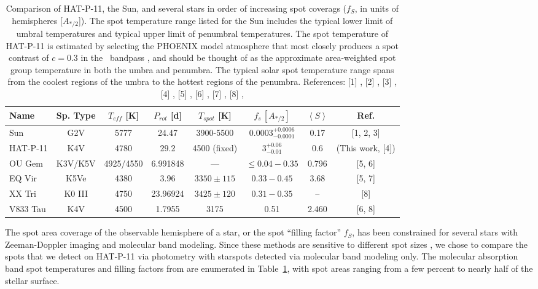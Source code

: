 \begin{table}
\centering
\footnotesize
\begin{tabular}{|lccccccc|} 
\hline
Name & Sp. Type & $T_{eff}$ [K] & $P_{rot}$ [d] & $T_{spot}$ [K] & $f_s \, [A_{*/2}]$ & $\left < S \right>$ & Ref. \\ \hline \hline
Sun & G2V & 5777 & 24.47 & 3900-5500 & $0.0003^{+0.0006}_{-0.0001}$ & 0.17 & [1, 2, 3]\\
HAT-P-11 & K4V & 4780 & 29.2 & 4500 (fixed) & $3^{+0.06}_{-0.01}$ & 0.6 & (This work, [4]) \\
OU Gem  & K3V/K5V & 4925/4550 & 6.991848 & --- & $\le 0.04 - 0.35$ & 0.796 & [5, 6] \\
EQ Vir  & K5Ve & 4380 & 3.96 &  $3350 \pm 115$ &$0.33 - 0.45$ & 3.68 & [5, 7] \\
XX Tri & K0 III & 4750 & 23.96924 & $3425 \pm 120$ & $0.31 - 0.35$ & -- & [8] \\
V833 Tau & K4V & 4500 & 1.7955 & 3175  & 0.51 & 2.460 & [6, 8] \\ \hline
\end{tabular}
\caption{Comparison of HAT-P-11, the Sun, and several stars in order of increasing spot coverags ($f_S$, in units of hemispheres [$A_{*/2}$]). The spot temperature range listed for the Sun includes the typical lower limit of umbral temperatures and typical upper limit of penumbral temperatures. The spot temperature of HAT-P-11 is estimated by selecting the PHOENIX model atmosphere that most closely produces a spot contrast of $c=0.3$ in the \kepler\ bandpass \citep{Husser2013}, and should be thought of as the approximate area-weighted spot group temperature in both the umbra and penumbra. The typical solar spot temperature range spans from the coolest regions of the umbra to the hottest regions of the penumbra. References: [1] \citet{Howard1984}, [2] \citet{Solanki2003}, [3] \citet{Egeland2017}, [4] \citet{Bakos2010}, [5] \citet{ONeal2001}, [6] \citet{Pace2013}, [7] \citet{Cincunegui2007}, [8] \citet{ONeal2004},  }
\label{tab:fillfactors}
\end{table}

The spot area coverage of the observable hemisphere of a star, or the spot ``filling factor'' $f_S$, has been constrained for several stars with Zeeman-Doppler imaging and molecular band modeling. Since these methods are sensitive to different spot sizes \citep{Solanki2004}, we chose to compare the spots that we detect on HAT-P-11 via photometry with starspots detected via molecular band modeling only. The molecular absorption band spot temperatures and filling factors from \citet{ONeal2001, ONeal2004} are enumerated in Table~\ref{tab:fillfactors}, with spot areas ranging from a few percent to nearly half of the stellar surface. 

